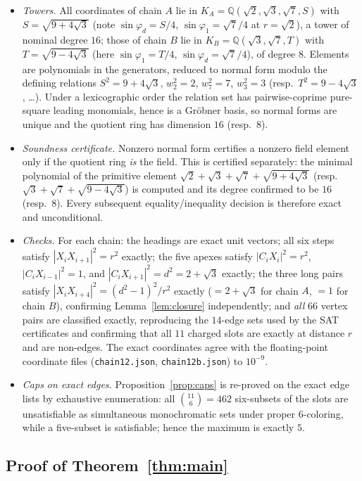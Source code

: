 \documentclass[11pt]{article}
\theoremstyle{definition}
\theoremstyle{remark}
\newcommand{\Q}{\mathbb{Q}}
\newcommand{\dd}{d}                          %
\begin{document}
\begin{itemize}
\item \emph{Towers.}  All coordinates of chain $A$ lie in
$K_A=\Q(\sqrt2,\sqrt3,\sqrt7,S)$ with $S=\sqrt{9+4\sqrt3}$
(note $\sin\varphi_{\dd}=S/4$, $\sin\varphi_1=\sqrt7/4$ at $r=\sqrt2$),
a tower of nominal degree $16$; those of chain $B$ lie in
$K_B=\Q(\sqrt3,\sqrt7,T)$ with $T=\sqrt{9-4\sqrt3}$
(here $\sin\varphi_1=T/4$, $\sin\varphi_{\dd}=\sqrt7/4$), of degree $8$.
Elements are polynomials in the generators, reduced to normal form
modulo the defining relations $S^2=9+4\sqrt3$, $w_2^2=2$, $w_7^2=7$,
$w_3^2=3$ (resp.\ $T^2=9-4\sqrt3$, \dots).  Under a lexicographic order
the relation set has pairwise-coprime pure-square leading monomials,
hence is a Gr\"obner basis, so normal forms are unique and the quotient
ring has dimension $16$ (resp.\ $8$).
\item \emph{Soundness certificate.}  Nonzero normal form certifies a
nonzero field element only if the quotient ring \emph{is} the field.
This is certified separately: the minimal polynomial of the primitive
element $\sqrt2+\sqrt3+\sqrt7+\sqrt{9+4\sqrt3}$ (resp.\
$\sqrt3+\sqrt7+\sqrt{9-4\sqrt3}$) is computed and its degree confirmed
to be $16$ (resp.\ $8$).  Every subsequent equality/inequality decision
is therefore exact and unconditional.
\item \emph{Checks.}  For each chain: the headings are exact unit
vectors; all six steps satisfy $|X_iX_{i+1}|^2=r^2$ exactly; the five
apexes satisfy $|C_iX_i|^2=r^2$, $|C_iX_{i-1}|^2=1$, and
$|C_iX_{i+1}|^2=\dd^2=2+\sqrt3$ exactly; the three long pairs satisfy
$|X_iX_{i+4}|^2=(\dd^2-1)^2/r^2$ exactly ($=2+\sqrt3$ for chain $A$,
$=1$ for chain $B$), confirming Lemma~\ref{lem:closure} independently;
and \emph{all} $66$ vertex pairs are classified exactly, reproducing
the $14$-edge sets used by the SAT certificates and confirming that all
$11$ charged slots are exactly at distance $r$ and are non-edges.  The
exact coordinates agree with the floating-point coordinate files
(\texttt{chain12.json}, \texttt{chain12b.json}) to $10^{-9}$.
\item \emph{Caps on exact edges.}  Proposition~\ref{prop:caps} is
re-proved on the exact edge lists by exhaustive enumeration: all
$\binom{11}{6}=462$ six-subsets of the slots are unsatisfiable as
simultaneous monochromatic sets under proper $6$-coloring, while a
five-subset is satisfiable; hence the maximum is exactly $5$.
\end{itemize}

\subsection{Proof of Theorem~\ref{thm:main}}
\end{document}
